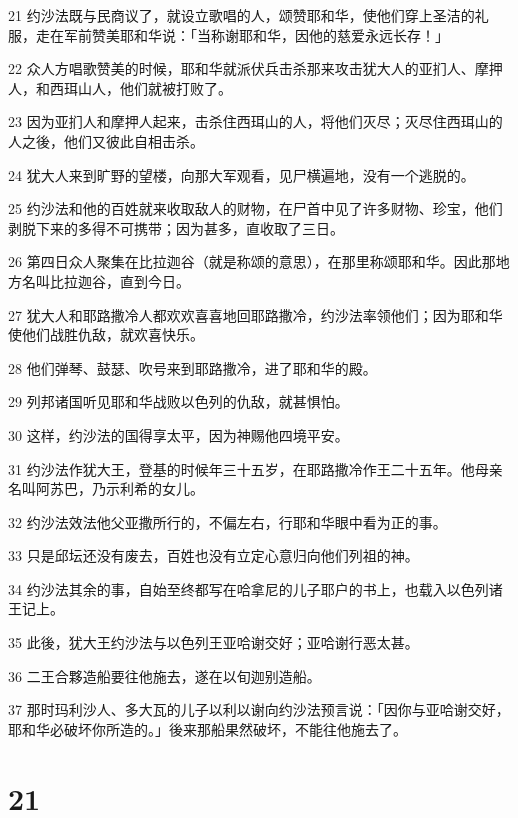 \par 21 约沙法既与民商议了，就设立歌唱的人，颂赞耶和华，使他们穿上圣洁的礼服，走在军前赞美耶和华说：「当称谢耶和华，因他的慈爱永远长存！」
\par 22 众人方唱歌赞美的时候，耶和华就派伏兵击杀那来攻击犹大人的亚扪人、摩押人，和西珥山人，他们就被打败了。
\par 23 因为亚扪人和摩押人起来，击杀住西珥山的人，将他们灭尽；灭尽住西珥山的人之後，他们又彼此自相击杀。
\par 24 犹大人来到旷野的望楼，向那大军观看，见尸横遍地，没有一个逃脱的。
\par 25 约沙法和他的百姓就来收取敌人的财物，在尸首中见了许多财物、珍宝，他们剥脱下来的多得不可携带；因为甚多，直收取了三日。
\par 26 第四日众人聚集在比拉迦谷（就是称颂的意思），在那里称颂耶和华。因此那地方名叫比拉迦谷，直到今日。
\par 27 犹大人和耶路撒冷人都欢欢喜喜地回耶路撒冷，约沙法率领他们；因为耶和华使他们战胜仇敌，就欢喜快乐。
\par 28 他们弹琴、鼓瑟、吹号来到耶路撒冷，进了耶和华的殿。
\par 29 列邦诸国听见耶和华战败以色列的仇敌，就甚惧怕。
\par 30 这样，约沙法的国得享太平，因为神赐他四境平安。
\par 31 约沙法作犹大王，登基的时候年三十五岁，在耶路撒冷作王二十五年。他母亲名叫阿苏巴，乃示利希的女儿。
\par 32 约沙法效法他父亚撒所行的，不偏左右，行耶和华眼中看为正的事。
\par 33 只是邱坛还没有废去，百姓也没有立定心意归向他们列祖的神。
\par 34 约沙法其余的事，自始至终都写在哈拿尼的儿子耶户的书上，也载入以色列诸王记上。
\par 35 此後，犹大王约沙法与以色列王亚哈谢交好；亚哈谢行恶太甚。
\par 36 二王合夥造船要往他施去，遂在以旬迦别造船。
\par 37 那时玛利沙人、多大瓦的儿子以利以谢向约沙法预言说：「因你与亚哈谢交好，耶和华必破坏你所造的。」後来那船果然破坏，不能往他施去了。

\chapter{21}

